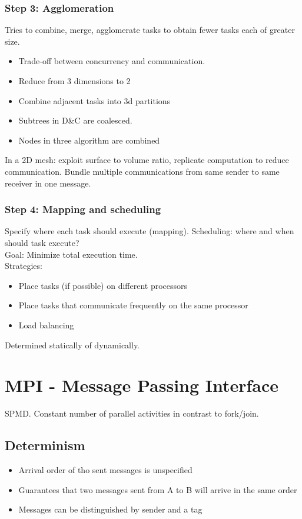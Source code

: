 \documentclass[a4paper]{article}
\begin{document}
\subsubsection{Step 3: Agglomeration}
Tries to combine, merge, agglomerate tasks to obtain fewer tasks each of greater
size.
\begin{itemize}
    \item Trade-off between concurrency and communication.
\end{itemize}
\begin{itemize}
    \item Reduce from 3 dimensions to 2
    \item Combine adjacent tasks into 3d partitions
    \item Subtrees in D\&C are coalesced.
    \item Nodes in three algorithm are combined
\end{itemize}
In a 2D mesh: exploit surface to volume ratio, replicate computation to
reduce communication. Bundle multiple communications from same sender to same
receiver in one message.
\subsubsection{Step 4: Mapping and scheduling}
Specify where each task should execute (mapping). Scheduling: where and when
should task execute?
\\Goal: Minimize total execution time.
\\Strategies:
\begin{itemize}
    \item Place tasks (if possible) on different processors
    \item Place tasks that communicate frequently on the same processor
    \item Load balancing
\end{itemize}
Determined statically of dynamically.
\section{MPI - Message Passing Interface}
SPMD. Constant number of parallel activities in contrast to fork/join.
\subsection{Determinism}
\begin{itemize}
    \item Arrival order of tho sent messages is unspecified
    \item Guarantees that two messages sent from A to B will arrive in the same
        order
    \item Messages can be distinguished by sender and a tag
\end{itemize}
\end{document}
